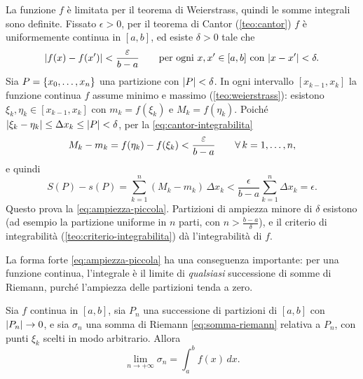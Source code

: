 \begin{dimostrazione}
La funzione $f$ è limitata per il teorema di Weierstrass, quindi le somme integrali
sono definite. Fissato $\epsilon>0$, per il teorema di Cantor (\cref{teo:cantor}) $f$ è
uniformemente continua in $[a,b]$, ed esiste $\delta>0$ tale che
\begin{equation}\label{eq:cantor-integrabilita}
  \lvert f(x)-f(x')\rvert<\frac{\varepsilon}{b-a} \qquad\text{per ogni } x,x'\in[a,b] \text{ con }
  \lvert x-x'\rvert<\delta .
\end{equation}
Sia $P=\left\{ x_{0},\dots,x_{n} \right\}$ una partizione con $\lvert P\rvert<\delta$. In ogni intervallo
$[x_{k-1},x_{k}]$ la funzione continua $f$ assume minimo e massimo (\cref{teo:weierstrass}):
esistono $\xi_{k},\eta_{k}\in[x_{k-1},x_{k}]$ con $m_{k}=f(\xi_{k})$ e $M_{k}=f(\eta_{k})$.
Poiché $\lvert \xi_{k}-\eta_{k}\rvert\le\Delta x_{k}\le\lvert P\rvert<\delta$, per la
\eqref{eq:cantor-integrabilita}
\[
  M_{k}-m_{k}=f(\eta_{k})-f(\xi_{k})<\frac{\varepsilon}{b-a} \qquad\forall\, k=1,\dots,n ,
\]
e quindi
\[
  S(P)-s(P)=\sum_{k=1}^{n}(M_{k}-m_{k})\,\Delta x_{k}
  <\frac\epsilon{b-a}\sum_{k=1}^{n}\Delta x_{k}=\epsilon .
\]
Questo prova la \eqref{eq:ampiezza-piccola}. Partizioni di ampiezza minore di $\delta$
esistono (ad esempio la partizione uniforme in $n$ parti, con $n>\frac{b-a}\delta$), e il
criterio di integrabilità (\cref{teo:criterio-integrabilita}) dà l'integrabilità di
$f$.
\end{dimostrazione}

La forma forte \eqref{eq:ampiezza-piccola} ha una conseguenza importante: per una
funzione continua, l'integrale è il limite di \emph{qualsiasi} successione di somme di
Riemann, purché l'ampiezza delle partizioni tenda a zero.

\begin{teorema}\label{teo:riemann-continue}
Sia $f$ continua in $[a,b]$, sia $P_{n}$ una successione di partizioni di $[a,b]$ con
$\lvert P_{n}\rvert\to0$, e sia $\sigma_{n}$ una somma di Riemann \eqref{eq:somma-riemann}
relativa a $P_{n}$, con punti $\xi_{k}$ scelti in modo arbitrario. Allora
\begin{equation}\label{eq:riemann-limite}
  \lim_{n\to+\infty}\sigma_{n}=\int_{a}^{b}f(x)\,dx .
\end{equation}
\end{teorema}

\begin{schema}
\end{schema}

